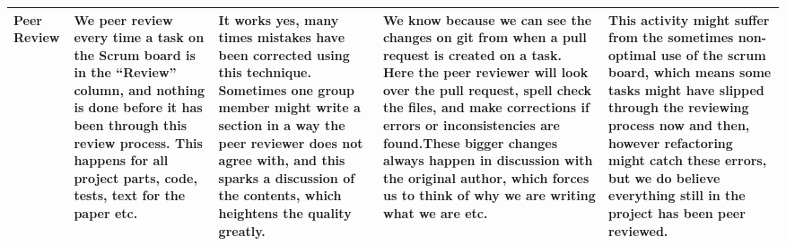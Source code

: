 \begin{sidewaystable}[]
\begin{tabularx}{\textwidth}{|l|X|X|X|X|}
Peer Review      & We peer review every time a task on the Scrum board is in the “Review” column, and nothing is done before it has been through this review process. This happens for all project parts, code, tests, text for the paper etc. & It works yes, many times mistakes have been corrected using this technique. Sometimes one group member might write a section in a way the peer reviewer does not agree with, and this sparks a discussion of the contents, which heightens the quality greatly. & We know because we can see the changes on git from when a pull request is created on a task. Here the peer reviewer will look over the pull request, spell check the files, and make corrections if errors or inconsistencies are found.These bigger changes always happen in discussion with the original author, which forces us to think of why we are writing what we are etc. & This activity might suffer from the sometimes non-optimal use of the scrum board, which means some tasks might have slipped through the reviewing process now and then, however refactoring might catch these errors, but we do believe everything still in the project has been peer reviewed. \\ \hline
\end{tabularx}
\end{sidewaystable}